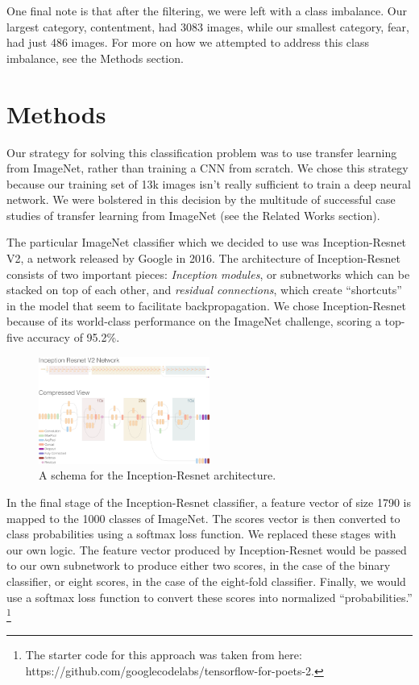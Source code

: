 \documentclass[10pt,twocolumn,letterpaper]{article}
\begin{document}
One final note is that after the filtering, we were left with a class imbalance. Our largest category, contentment, had 3083 images, while our smallest category, fear, had just 486 images. For more on how we attempted to address this class imbalance, see the Methods section.

\section{Methods}

Our strategy for solving this classification problem was to use transfer learning from ImageNet, rather than training a CNN from scratch. We chose this strategy because our training set of 13k images isn't really sufficient to train a deep neural network. We were bolstered in this decision by the multitude of successful case studies of transfer learning from ImageNet (see the Related Works section).

The particular ImageNet classifier which we decided to use was Inception-Resnet V2, a network released by Google in 2016\cite{inceptionresnet}. The architecture of Inception-Resnet consists of two important pieces: \textit{Inception modules}, or subnetworks which can be stacked on top of each other, and \textit{residual connections}, which create ``shortcuts'' in the model that seem to facilitate backpropagation. We chose Inception-Resnet because of its world-class performance on the ImageNet challenge, scoring a top-five accuracy of 95.2\%.

\begin{figure}
\centering
\includegraphics[width=0.5\textwidth]{inception_resnet_architecture.png}
\caption{A schema for the Inception-Resnet architecture.}
\end{figure}

In the final stage of the Inception-Resnet classifier, a feature vector of size 1790 is mapped to the 1000 classes of ImageNet. The scores vector is then converted to class probabilities using a softmax loss function. We replaced these stages with our own logic. The feature vector produced by Inception-Resnet would be passed to our own subnetwork to produce either two scores, in the case of the binary classifier, or eight scores, in the case of the eight-fold classifier. Finally, we would use a softmax loss function to convert these scores into normalized ``probabilities.'' \footnote{The starter code for this approach was taken from here: https://github.com/googlecodelabs/tensorflow-for-poets-2.}
\end{document}
